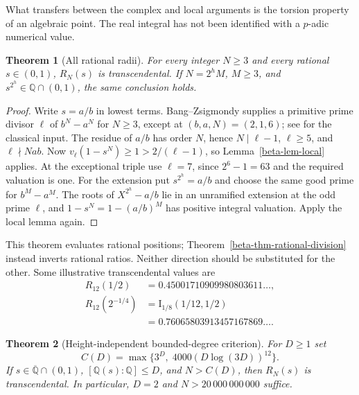 \documentclass[11pt,a4paper]{article}
\newtheorem{theorem}{Theorem}[section]
\theoremstyle{definition}
\theoremstyle{remark}
\numberwithin{equation}{section}
\begin{document}
What transfers between the complex and local arguments is the torsion
property of an algebraic point.  The real integral has not been
identified with a $p$-adic numerical value.

\begin{theorem}[All rational radii]\label{beta-thm-rational-radii}
For every integer $N\ge3$ and every rational $s\in(0,1)$, $R_N(s)$ is
transcendental.  If $N=2^hM$, $M\ge3$, and $s^{2^h}\in\mathbb Q\cap(0,1)$,
the same conclusion holds.
\end{theorem}

\begin{proof}
Write $s=a/b$ in lowest terms.  Bang--Zsigmondy supplies a primitive
prime divisor $\ell$ of $b^N-a^N$ for $N\ge3$, except at
$(b,a,N)=(2,1,6)$; see \cite{beta-voutier} for the classical input.
The residue of $a/b$ has order $N$, hence $N\mid\ell-1$,
$\ell\ge5$, and $\ell\nmid Nab$.  Now
$v_\ell(1-s^N)\ge1>2/(\ell-1)$, so
Lemma~\ref{beta-lem-local} applies.  At the exceptional triple use
$\ell=7$, since $2^6-1=63$ and the required valuation is one.
For the extension put $s^{2^h}=a/b$ and choose the same good prime for
$b^M-a^M$.  The roots of $X^{2^h}-a/b$ lie in an unramified extension
at the odd prime $\ell$, and $1-s^N=1-(a/b)^M$ has positive integral
valuation.  Apply the local lemma again.
\end{proof}

This theorem evaluates rational positions; Theorem~\ref{beta-thm-rational-division}
instead inverts rational ratios.  Neither direction should be substituted
for the other.  Some illustrative transcendental values are
\[
\begin{aligned}
R_{12}(1/2)&=0.45001710909980803611\ldots,\\
R_{12}(2^{-1/4})&=\mathrm I_{1/8}(1/12,1/2)\\
&=0.76065803913457167869\ldots.
\end{aligned}
\]

\begin{theorem}[Height-independent bounded-degree criterion]
\label{beta-thm-degree}
For $D\ge1$ set
\[
C(D)=\max\{3^D,\;4000(D\log(3D))^{12}\}.
\]
If $s\in\overline{\mathbb Q}\cap(0,1)$, $[\mathbb Q(s):\mathbb Q]\le D$,
and $N>C(D)$, then $R_N(s)$ is transcendental.  In particular,
$D=2$ and $N>20\,000\,000\,000$ suffice.
\end{theorem}
\end{document}
